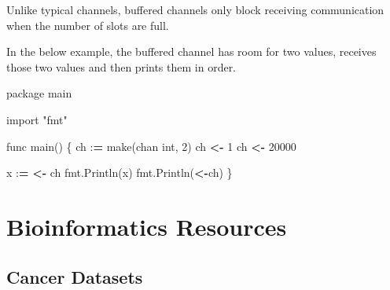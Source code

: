 \documentclass[]{book}
\newenvironment{Shaded}{\begin{snugshade}}{\end{snugshade}}
\newcommand{\DecValTok}[1]{\textcolor[rgb]{0.00,0.00,0.81}{#1}}
\newcommand{\StringTok}[1]{\textcolor[rgb]{0.31,0.60,0.02}{#1}}
\newcommand{\ImportTok}[1]{#1}
\newcommand{\OperatorTok}[1]{\textcolor[rgb]{0.81,0.36,0.00}{\textbf{#1}}}
\newcommand{\BuiltInTok}[1]{#1}
\newcommand{\NormalTok}[1]{#1}
\begin{document}
Unlike typical channels, buffered channels only block receiving
communication when the number of slots are full.

In the below example, the buffered channel has room for two values,
receives those two values and then prints them in order.

\begin{Shaded}
\begin{Highlighting}[]
\NormalTok{package main}

\ImportTok{import} \StringTok{"fmt"}

\NormalTok{func main() \{}
\NormalTok{    ch :}\OperatorTok{=}\NormalTok{ make(chan }\BuiltInTok{int}\NormalTok{, }\DecValTok{2}\NormalTok{)}
\NormalTok{    ch }\OperatorTok{<-} \DecValTok{1}
\NormalTok{    ch }\OperatorTok{<-} \DecValTok{20000}
    
\NormalTok{    x :}\OperatorTok{=} \OperatorTok{<-}\NormalTok{ ch}
\NormalTok{    fmt.Println(x)}
\NormalTok{    fmt.Println(}\OperatorTok{<-}\NormalTok{ch)}
\NormalTok{\}}
\end{Highlighting}
\end{Shaded}

\chapter{Bioinformatics Resources}\label{resources}

\section{Cancer Datasets}\label{cancer-datasets}
\end{document}
